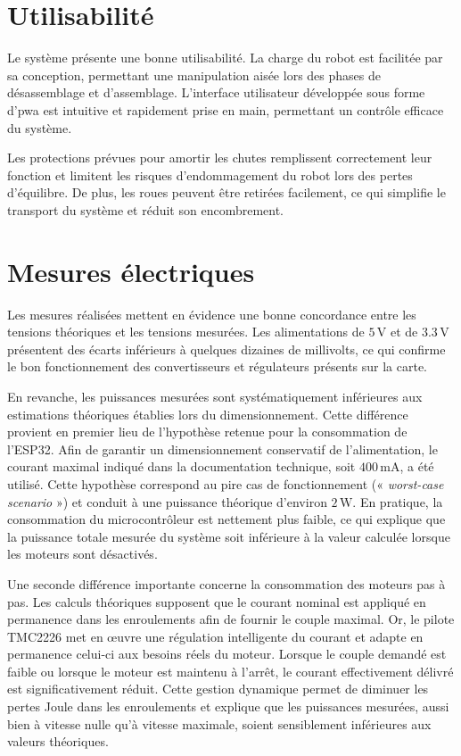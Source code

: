 \section{Utilisabilité}

Le système présente une bonne utilisabilité. La charge du robot est facilitée par sa conception, permettant une manipulation aisée lors des phases de désassemblage et d'assemblage. L'interface utilisateur développée sous forme d'\acrshort{pwa} est intuitive et rapidement prise en main, permettant un contrôle efficace du système.

Les protections prévues pour amortir les chutes remplissent correctement leur fonction et limitent les risques d'endommagement du robot lors des pertes d'équilibre. De plus, les roues peuvent être retirées facilement, ce qui simplifie le transport du système et réduit son encombrement.
\section{Mesures électriques}

Les mesures réalisées mettent en évidence une bonne concordance entre les tensions théoriques et les tensions mesurées. Les alimentations de $5\,\si{\volt}$ et de $3.3\,\si{\volt}$ présentent des écarts inférieurs à quelques dizaines de millivolts, ce qui confirme le bon fonctionnement des convertisseurs et régulateurs présents sur la carte.

En revanche, les puissances mesurées sont systématiquement inférieures aux estimations théoriques établies lors du dimensionnement. Cette différence provient en premier lieu de l'hypothèse retenue pour la consommation de l'ESP32. Afin de garantir un dimensionnement conservatif de l'alimentation, le courant maximal indiqué dans la documentation technique, soit $400\,\si{\milli\ampere}$, a été utilisé. Cette hypothèse correspond au pire cas de fonctionnement (« \textit{worst-case scenario} ») et conduit à une puissance théorique d'environ $2\,\si{\watt}$. En pratique, la consommation du microcontrôleur est nettement plus faible, ce qui explique que la puissance totale mesurée du système soit inférieure à la valeur calculée lorsque les moteurs sont désactivés.

Une seconde différence importante concerne la consommation des moteurs pas à pas. Les calculs théoriques supposent que le courant nominal est appliqué en permanence dans les enroulements afin de fournir le couple maximal. Or, le pilote TMC2226 met en œuvre une régulation intelligente du courant et adapte en permanence celui-ci aux besoins réels du moteur. Lorsque le couple demandé est faible ou lorsque le moteur est maintenu à l'arrêt, le courant effectivement délivré est significativement réduit. Cette gestion dynamique permet de diminuer les pertes Joule dans les enroulements et explique que les puissances mesurées, aussi bien à vitesse nulle qu'à vitesse maximale, soient sensiblement inférieures aux valeurs théoriques.


